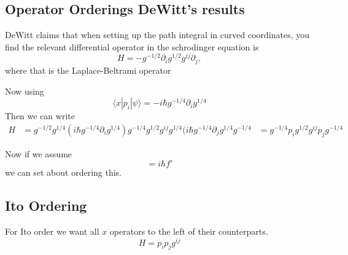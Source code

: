 \subsection{Operator Orderings DeWitt's results}
DeWitt claims that when setting up the path integral in curved coordinates, you find the relevant differential operator in the schrodinger equation is 
\begin{equation}
H = -g^{-1/2}\partial_i g^{1/2}g^{ij}\partial_j,
\end{equation}
where that is the Laplace-Beltrami operator

Now using 
\begin{equation}
\langle x| p_i |\psi\rangle = -i\hbar g^{-1/4}\partial_i g^{1/4}
\end{equation}
Then we can write 
\begin{align}
H &= g^{-1/2}g^{1/4}(i\hbar g^{-1/4}\partial_i g^{1/4}) g^{-1/4} g^{1/2}g^{ij} g^{1/4}(i\hbar g^{-1/4} \partial_j g^{1/4} g^{-1/4}
&= g^{-1/4}p_i  g^{1/2}g^{ij}p_j g^{-1/4}
\end{align}

Now if we assume 
\begin{equation}
[f(x),p] = i\hbar f'
\end{equation}
we can set about ordering this.  

\subsection{Ito Ordering}

For Ito order we want all $x$ operators to the left of their counterparts.  
\begin{equation}
H = p_ip_j g^{ij}
\end{equation}

